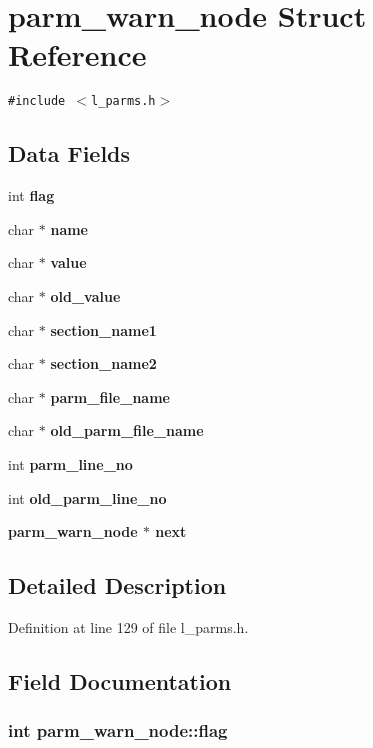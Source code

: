 \section{parm\_\-warn\_\-node Struct Reference}
\label{structparm__warn__node}
{\tt \#include $<$l\_\-parms.h$>$}

\subsection*{Data Fields}
\begin{CompactItemize}
\item 
int \bf{flag}
\item 
char $\ast$ \bf{name}
\item 
char $\ast$ \bf{value}
\item 
char $\ast$ \bf{old\_\-value}
\item 
char $\ast$ \bf{section\_\-name1}
\item 
char $\ast$ \bf{section\_\-name2}
\item 
char $\ast$ \bf{parm\_\-file\_\-name}
\item 
char $\ast$ \bf{old\_\-parm\_\-file\_\-name}
\item 
int \bf{parm\_\-line\_\-no}
\item 
int \bf{old\_\-parm\_\-line\_\-no}
\item 
\bf{parm\_\-warn\_\-node} $\ast$ \bf{next}
\end{CompactItemize}


\subsection{Detailed Description}




Definition at line 129 of file l\_\-parms.h.

\subsection{Field Documentation}
\subsubsection{\setlength{\rightskip}{0pt plus 5cm}int \bf{parm\_\-warn\_\-node::flag}}\label{structparm__warn__node_0e43cb7ccaba76920a2f8f6f6b9ba053}




